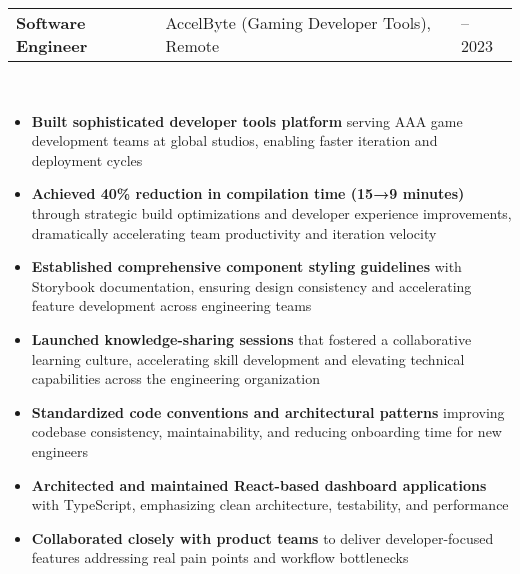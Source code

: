 \documentclass[a4paper, 11pt]{article}
\newcommand{\resumeItem}[1]{
  \item\small{
    {#1 \vspace{-2pt}}
  }
}
\newcommand{\resumeSubheading}[4]{
  \vspace{-2pt}\item
    \begin{tabularx}{0.987\textwidth}[t]{
  >{\raggedright\arraybackslash}X
  >{\centering\arraybackslash}X
  >{\raggedleft\arraybackslash}X }
      \textbf{#1} & #2 & #3 \\
    \end{tabularx}
    \textit{\small#4}\\
    \vspace{-7pt}
}
\newcommand{\resumeItemListStart}{\begin{itemize}[leftmargin=0.22in]}
\newcommand{\resumeItemListEnd}{\end{itemize}\vspace{-20pt}}
\begin{document}
        \resumeSubheading
            {Software Engineer}{AccelByte (Gaming Developer Tools), Remote}{2022 -- 2023}{}
            \resumeItemListStart
                \resumeItem{\textbf{Built sophisticated developer tools platform} serving AAA game development teams at global studios, enabling faster iteration and deployment cycles}
                \resumeItem{\textbf{Achieved 40\% reduction in compilation time (15→9 minutes)} through strategic build optimizations and developer experience improvements, dramatically accelerating team productivity and iteration velocity}
                \resumeItem{\textbf{Established comprehensive component styling guidelines} with Storybook documentation, ensuring design consistency and accelerating feature development across engineering teams}
                \resumeItem{\textbf{Launched knowledge-sharing sessions} that fostered a collaborative learning culture, accelerating skill development and elevating technical capabilities across the engineering organization}
                \resumeItem{\textbf{Standardized code conventions and architectural patterns} improving codebase consistency, maintainability, and reducing onboarding time for new engineers}
                \resumeItem{\textbf{Architected and maintained React-based dashboard applications} with TypeScript, emphasizing clean architecture, testability, and performance}
                \resumeItem{\textbf{Collaborated closely with product teams} to deliver developer-focused features addressing real pain points and workflow bottlenecks}
            \resumeItemListEnd
\end{document}
